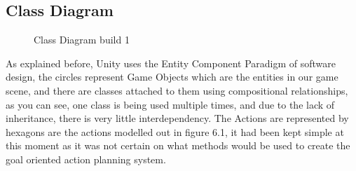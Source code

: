 \documentclass[11pt]{report}
\begin{document}
\subsection{Class Diagram}

\begin{figure}[H]
    \centering
    \caption{Class Diagram build 1}
\end{figure}

As explained before, Unity uses the Entity Component Paradigm of software design, the circles represent Game Objects which are the entities in our game scene, and there are classes attached to them using compositional relationships, as you can see, one class is being used multiple times, and due to the lack of inheritance, there is very little interdependency. 
The Actions are represented by hexagons are the actions modelled out in figure 6.1, it had been kept simple at this moment as it was not certain on what methods would be used to create the goal oriented action planning system.
\end{document}
